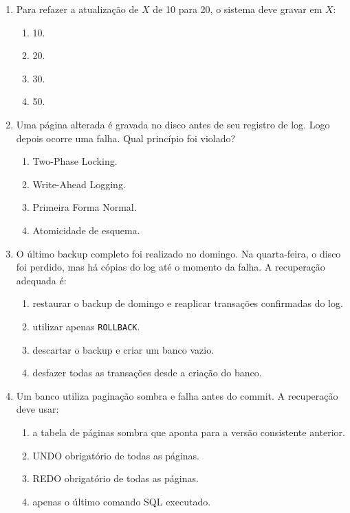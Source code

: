 \documentclass[12pt,a4paper]{article}
\begin{document}
\begin{enumerate}[resume,label=\textbf{Q\arabic*.}]
\item Para refazer a atualização de $X$ de 10 para 20, o sistema deve gravar em $X$:

\begin{enumerate}[label=\alph*)]
    \item 10.
    \item 20.
    \item 30.
    \item 50.
\end{enumerate}

\item Uma página alterada é gravada no disco antes de seu registro de log. Logo depois ocorre uma falha. Qual princípio foi violado?

\begin{enumerate}[label=\alph*)]
    \item Two-Phase Locking.
    \item Write-Ahead Logging.
    \item Primeira Forma Normal.
    \item Atomicidade de esquema.
\end{enumerate}

\item O último backup completo foi realizado no domingo. Na quarta-feira, o disco foi perdido, mas há cópias do log até o momento da falha. A recuperação adequada é:

\begin{enumerate}[label=\alph*)]
    \item restaurar o backup de domingo e reaplicar transações confirmadas do log.
    \item utilizar apenas \texttt{ROLLBACK}.
    \item descartar o backup e criar um banco vazio.
    \item desfazer todas as transações desde a criação do banco.
\end{enumerate}

\item Um banco utiliza paginação sombra e falha antes do commit. A recuperação deve usar:

\begin{enumerate}[label=\alph*)]
    \item a tabela de páginas sombra que aponta para a versão consistente anterior.
    \item UNDO obrigatório de todas as páginas.
    \item REDO obrigatório de todas as páginas.
    \item apenas o último comando SQL executado.
\end{enumerate}

\end{enumerate}
\end{document}

